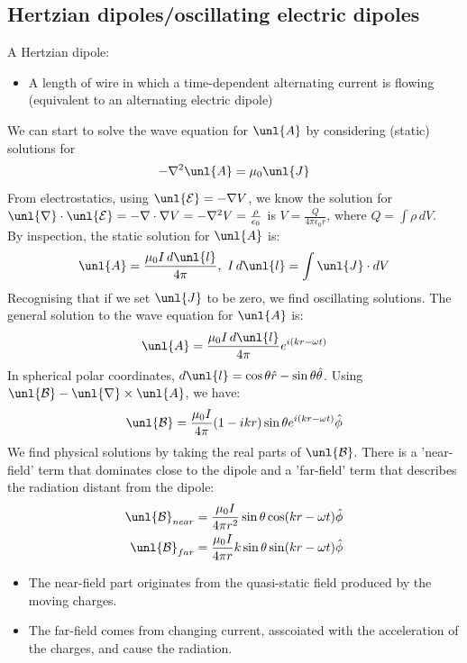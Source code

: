 \documentclass[a4paper, 11pt, normalem]{report}
\newcommand\E{\mathcal{E}}
\newcommand\uE{\unl{\E}}
\newcommand\B{\mathcal{B}}
\newcommand\uB{\unl{\B}}
\newcommand\del{\unl{\nabla}}
\newcommand\eno{\epsilon_0}
\newcommand\hr{\hat{r}}
\newcommand\om{\omega}
\newcommand\J{\unl{J}}
\newcommand\A{\unl{A}}
\begin{document}
\subsection{Hertzian dipoles/oscillating electric dipoles}
A Hertzian dipole:
\begin{itemize}
	\item A length of wire in which a time-dependent alternating current is flowing (equivalent to an alternating electric dipole)
\end{itemize}
We can start to solve the wave equation for $\A$ by considering (static) solutions for
\begin{equation}
	-\nabla^2\A = \mu_0\J
\end{equation}
From electrostatics, using $\uE = -\nabla V$, we know the solution for $\del\cdot\uE = -\nabla\cdot\nabla V = -\nabla^2V = \frac{\rho}{\eno}$ is $V = \frac{Q}{4\pi\eno r}$, where $Q = \int \rho\,dV$. \\
By inspection, the static solution for $\A$ is:
\begin{equation}
	\A = \frac{\mu_0 I\,d\unl{l}}{4\pi},~ I\,d\unl{l} = \int \J\cdot dV
\end{equation}
Recognising that if we set $\J$ to be zero, we find oscillating solutions.
The general solution to the wave equation for $\A$ is:
\begin{equation}
	\A = \frac{\mu_0I\,d\unl{l}}{4\pi}e^{i(kr - \om t)}
\end{equation}
In spherical polar coordinates, $d\unl{l} = \cos\theta\hr - \sin\theta\hat{\theta}$.
Using $\uB - \del\times\A$, we have:
\begin{equation}
	\uB = \frac{\mu_0I}{4\pi}(1 - ikr)\sin\theta e^{i(kr - \om t)}\hat{\phi}
\end{equation}
We find physical solutions by taking the real parts of $\uB$.
There is a 'near-field' term that dominates close to the dipole and a 'far-field' term that describes the radiation distant from the dipole:
\begin{align}
	\uB_{near} &= \frac{\mu_0I}{4\pi r^2}\sin\theta \cos(kr - \om t)\hat{\phi} \\
	\uB_{far} &= \frac{\mu_0I}{4\pi r}k\sin\theta\sin(kr - \om t)\hat{\phi}
\end{align}
\begin{itemize}
	\item The near-field part originates from the quasi-static field produced by the moving charges.
	\item The far-field comes from changing current, asscoiated with the acceleration of the charges, and cause the radiation.
\end{itemize}
\end{document}
